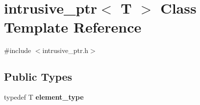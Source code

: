 \hypertarget{classintrusive__ptr}{\section{intrusive\-\_\-ptr$<$ T $>$ Class Template Reference}
\label{classintrusive__ptr}
}


{\ttfamily \#include $<$intrusive\-\_\-ptr.\-h$>$}

\subsection*{Public Types}
\begin{DoxyCompactItemize}
\item 
\hypertarget{classintrusive__ptr_ae15c9aa35038587012d1b08729cc19c9}{typedef T {\bfseries element\-\_\-type}}\label{classintrusive__ptr_ae15c9aa35038587012d1b08729cc19c9}

\end{DoxyCompactItemize}
